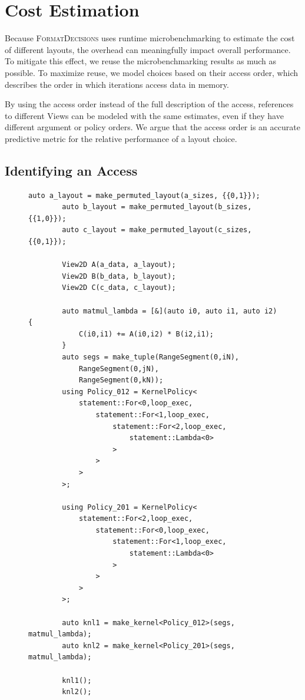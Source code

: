 \documentclass[sigconf,review=true]{acmart}
\newcommand{\FormatDecisions}[0]{{\textsc{FormatDecisions}}}
\begin{document}
\section{Cost Estimation}

Because \FormatDecisions{} uses runtime microbenchmarking to estimate the cost of different layouts, the overhead can meaningfully impact overall performance. 
To mitigate this effect, we reuse the microbenchmarking results as much as possible.
To maximize reuse, we model choices based on their access order, which describes the order in which iterations access data in memory.

By using the access order instead of the full description of the access, references to different Views can be modeled with the same estimates, even if they have different argument or policy orders.
We argue that the access order is an accurate predictive metric for the relative performance of a layout choice. 

\subsection{Identifying an Access}
\begin{figure}[tbp]
	\begin{lstlisting}[caption={Two implementations of matrix multiplication using different kernel policies.}, autogobble, label={MatMulTraversalOrder}]
		auto a_layout = make_permuted_layout(a_sizes, {{0,1}});
		auto b_layout = make_permuted_layout(b_sizes, {{1,0}});
		auto c_layout = make_permuted_layout(c_sizes, {{0,1}});

		View2D A(a_data, a_layout);
		View2D B(b_data, b_layout);
		View2D C(c_data, c_layout);

		auto matmul_lambda = [&](auto i0, auto i1, auto i2) {
			C(i0,i1) += A(i0,i2) * B(i2,i1);
		}
		auto segs = make_tuple(RangeSegment(0,iN), 
			RangeSegment(0,jN), 
			RangeSegment(0,kN));
		using Policy_012 = KernelPolicy<
			statement::For<0,loop_exec,
				statement::For<1,loop_exec,
					statement::For<2,loop_exec,
						statement::Lambda<0>
					>
				>
			>
		>;

		using Policy_201 = KernelPolicy<
			statement::For<2,loop_exec,
				statement::For<0,loop_exec,
					statement::For<1,loop_exec,
						statement::Lambda<0>
					>
				>
			>
		>;

		auto knl1 = make_kernel<Policy_012>(segs, matmul_lambda);
		auto knl2 = make_kernel<Policy_201>(segs, matmul_lambda);

		knl1();
		knl2();
	\end{lstlisting}
\end{figure}
\end{document}
